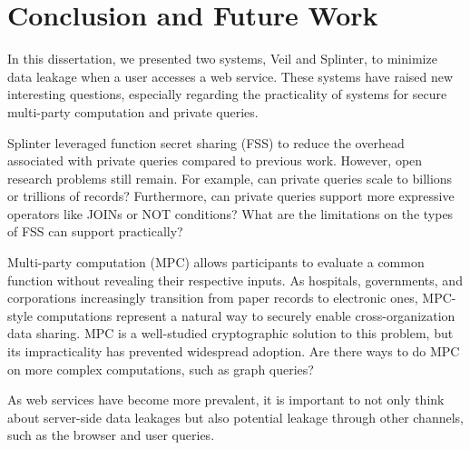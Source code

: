 \section{Conclusion and Future Work}
\label{chap:concl}

In this dissertation, we presented two systems, Veil and Splinter,
to minimize data leakage when a user accesses a web service. 
These systems have raised new interesting questions,
especially regarding the practicality of 
systems for secure multi-party computation and private queries.

Splinter leveraged
function secret sharing (FSS) to reduce the overhead associated with private queries compared to previous
work. However, open research problems still remain. For example, can private queries scale to billions
or trillions of records? Furthermore, can private queries support more expressive operators like JOINs or
NOT conditions? What are the limitations on the types of FSS can support practically?

Multi-party computation (MPC) allows participants to evaluate a common function without revealing
their respective inputs. As hospitals, governments, and corporations increasingly transition from
paper records to electronic ones, MPC-style computations represent a natural way to securely enable
cross-organization data sharing. MPC is a well-studied cryptographic solution to this problem, but its
impracticality has prevented widespread adoption. Are there ways to do MPC on more complex
computations, such as graph queries?

As web services have become more prevalent, it is important to not only think about
server-side data leakages but also potential leakage through other channels,
such as the browser and user queries.